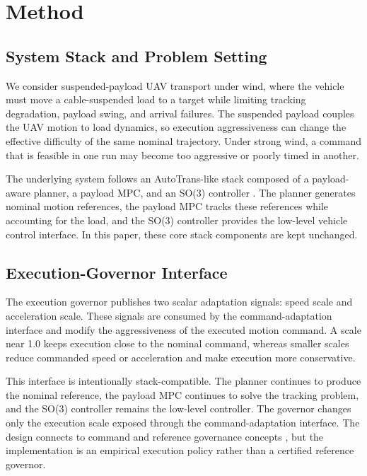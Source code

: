 \section{Method}

\subsection{System Stack and Problem Setting}

We consider suspended-payload UAV transport under wind, where the vehicle must
move a cable-suspended load to a target while limiting tracking degradation,
payload swing, and arrival failures. The suspended payload couples the UAV
motion to load dynamics, so execution aggressiveness can change the effective
difficulty of the same nominal trajectory. Under strong wind, a command that
is feasible in one run may become too aggressive or poorly timed in another.

The underlying system follows an AutoTrans-like stack composed of a
payload-aware planner, a payload MPC, and an SO(3) controller
\cite{Li2023AutoTrans,UrbinaBrito2021PredictivePayloadTransport,Lee2010GeometricTrackingSE3}.
The planner generates nominal motion references, the payload MPC tracks these
references while accounting for the load, and the SO(3) controller provides the
low-level vehicle control interface. In this paper, these core stack
components are kept unchanged.

\subsection{Execution-Governor Interface}

The execution governor publishes two scalar adaptation signals:
speed scale and acceleration scale. These signals are
consumed by the command-adaptation interface and modify the aggressiveness of
the executed motion command. A scale near 1.0 keeps execution close to the
nominal command, whereas smaller scales reduce commanded speed or acceleration
and make execution more conservative.

This interface is intentionally stack-compatible. The planner continues to
produce the nominal reference, the payload MPC continues to solve the tracking
problem, and the SO(3) controller remains the low-level controller. The governor
changes only the execution scale exposed through the command-adaptation
interface. The design connects to command and reference governance concepts
\cite{Garone2017ReferenceCommandGovernorsSurvey,Garone2016ExplicitReferenceGovernor,Li2021ActionGovernor},
but the implementation is an empirical execution policy rather than a certified
reference governor.

